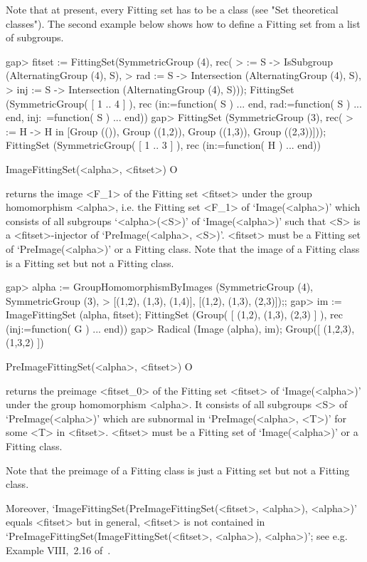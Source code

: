Note that at present, every Fitting set has to be a class (see "Set theoretical
classes"). The second example below shows how to define a Fitting set from 
a list of subgroups.


\beginexample
gap>  fitset := FittingSet(SymmetricGroup (4), rec(
>        \in := S -> IsSubgroup (AlternatingGroup (4), S),
>        rad := S -> Intersection (AlternatingGroup (4), S),
>        inj := S -> Intersection (AlternatingGroup (4), S)));
FittingSet (SymmetricGroup( 
[ 1 .. 4 ] ), rec (in:=function( S ) ... end, rad:=function( S ) ... end, inj:\
=function( S ) ... end))
gap> FittingSet (SymmetricGroup (3), rec(
>       \in := H -> H in [Group (()), Group ((1,2)), Group ((1,3)), Group ((2,3))]));
FittingSet (SymmetricGroup( [ 1 .. 3 ] ), rec (in:=function( H ) ... end))
\endexample

\>ImageFittingSet(<alpha>, <fitset>) O

returns the image <F_1> of the Fitting set <fitset> under the group homomorphism 
<alpha>, i.e.
the Fitting set <F_1> of `Image(<alpha>)' which consists of all subgroups
`<alpha>(<S>)' of `Image(<alpha>)' such that <S> is a <fitset>-injector of 
`PreImage(<alpha>, <S>)'. <fitset> must be a Fitting set of `PreImage(<alpha>)'
or a Fitting class.  Note that the image of a Fitting class is a
Fitting set but not a Fitting class.

\beginexample
gap> alpha := GroupHomomorphismByImages (SymmetricGroup (4), SymmetricGroup (3),
>  [(1,2), (1,3), (1,4)], [(1,2), (1,3), (2,3)]);;
gap> im := ImageFittingSet (alpha, fitset);
FittingSet (Group( [ (1,2), (1,3), (2,3) 
 ] ), rec (inj:=function( G ) ... end))
gap> Radical (Image (alpha), im);
Group([ (1,2,3), (1,3,2) ])
\endexample

\>PreImageFittingSet(<alpha>, <fitset>) O

returns the preimage <fitset_0> of the Fitting set <fitset> of `Image(<alpha>)' under the group homomorphism <alpha>. It consists of all
subgroups <S> of `PreImage(<alpha>)' which are subnormal in `PreImage(<alpha>, <T>)' for some <T> in <fitset>. <fitset> must be a Fitting set of
`Image(<alpha>)' or a Fitting class. 

Note that the preimage of a Fitting class is just a Fitting set but 
not a Fitting class.

Moreover, `ImageFittingSet(PreImageFittingSet(<fitset>, <alpha>),
<alpha>)' equals <fitset> but in general, <fitset> is not contained in
`PreImageFittingSet(ImageFittingSet(<fitset>, <alpha>), <alpha>)'; see
e.g. Example VIII,~2.16 of~\cite{DH92}.

